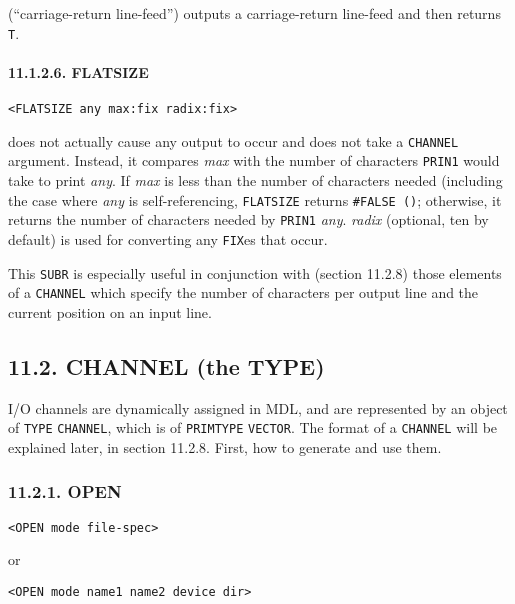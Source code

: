 \documentclass[a4paper,]{article}
\let\oldparagraph\paragraph
\renewcommand{\paragraph}[1]{\oldparagraph{#1}\mbox{}}
\begin{document}
 (``carriage-return line-feed'') outputs a carriage-return line-feed and then returns
\texttt{T}.

\paragraph{11.1.2.6. FLATSIZE}\label{flatsize}

\begin{verbatim}
<FLATSIZE any max:fix radix:fix>
\end{verbatim}

 does not actually cause any output to occur and does not take a \texttt{CHANNEL} argument.
Instead, it compares \emph{max} with the number of characters \texttt{PRIN1} would take to print \emph{any}. If \emph{max}
is less than the number of characters needed (including the case where \emph{any} is self-referencing, \texttt{FLATSIZE}
returns \texttt{\#FALSE\ ()}; otherwise, it returns the number of characters needed by \texttt{PRIN1} \emph{any}.
\emph{radix} (optional, ten by default) is used for converting any \texttt{FIX}es that occur.

This \texttt{SUBR} is especially useful in conjunction with (section 11.2.8) those elements of a \texttt{CHANNEL} which
specify the number of characters per output line and the current position on an input line.

\subsection{11.2. CHANNEL (the TYPE)}\label{channel-the-type}

I/O channels are dynamically assigned in MDL, and are represented by an object of \texttt{TYPE}
\texttt{CHANNEL}, which is of \texttt{PRIMTYPE} \texttt{VECTOR}. The format of a
\texttt{CHANNEL} will be explained later, in section 11.2.8. First, how to generate and use them.

\subsubsection{11.2.1. OPEN}\label{open}

\begin{verbatim}
<OPEN mode file-spec>
\end{verbatim}

or

\begin{verbatim}
<OPEN mode name1 name2 device dir>
\end{verbatim}
\end{document}
